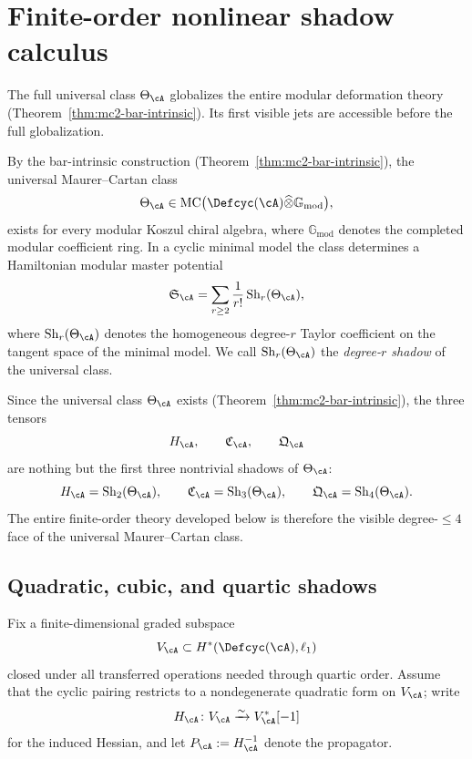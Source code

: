 \section{Finite-order nonlinear shadow calculus}
\label{sec:nms-shadow-calculus}

The full universal class $\Theta_{\cA}$ globalizes the entire modular deformation theory (Theorem~\ref{thm:mc2-bar-intrinsic}). Its first visible jets are accessible before the full globalization.

\begin{definition}
\label{def:nms-degree-shadows}
By the bar-intrinsic construction (Theorem~\ref{thm:mc2-bar-intrinsic}), the universal Maurer--Cartan class
\[
\Theta_{\cA}\in \mathrm{MC}\bigl(\Defcyc(\cA)\widehat\otimes \mathbb G_{\mathrm{mod}}\bigr),
\]
exists for every modular Koszul chiral algebra, where $\mathbb G_{\mathrm{mod}}$ denotes the completed modular coefficient ring. In a cyclic minimal model the class determines a Hamiltonian modular master potential
\[
\mathfrak S_{\cA}=\sum_{r\ge 2}\frac{1}{r!}\,\mathrm{Sh}_r(\Theta_{\cA}),
\]
where $\mathrm{Sh}_r(\Theta_{\cA})$ denotes the homogeneous degree-$r$ Taylor coefficient on the tangent space of the minimal model. We call $\mathrm{Sh}_r(\Theta_{\cA})$ the \emph{degree-$r$ shadow} of the universal class.
\end{definition}

\begin{remark}
\label{rem:nms-hcq-as-degree-shadows}
Since the universal class $\Theta_\cA$ exists (Theorem~\ref{thm:mc2-bar-intrinsic}), the three tensors
\[
H_{\cA},\qquad \mathfrak C_{\cA},\qquad \mathfrak Q_{\cA}
\]
are nothing but the first three nontrivial shadows of $\Theta_{\cA}$:
\[
H_{\cA}=\mathrm{Sh}_2(\Theta_{\cA}),
\qquad
\mathfrak C_{\cA}=\mathrm{Sh}_3(\Theta_{\cA}),
\qquad
\mathfrak Q_{\cA}=\mathrm{Sh}_4(\Theta_{\cA}).
\]
The entire finite-order theory developed below is therefore the visible degree-$\le 4$ face of the universal Maurer--Cartan class.
\end{remark}

\subsection{Quadratic, cubic, and quartic shadows}
\label{subsec:nms-shadow-jets}

\begin{setup}
\label{setup:nms-cyclic-slice}
Fix a finite-dimensional graded subspace
\[
V_{\cA}\subset H^*(\Defcyc(\cA),\ell_1)
\]
closed under all transferred operations needed through quartic order. Assume that the cyclic pairing restricts to a nondegenerate quadratic form on $V_{\cA}$; write
\[
H_{\cA}\colon V_{\cA}\xrightarrow{\sim}V_{\cA}^*[-1]
\]
for the induced Hessian, and let $P_{\cA}:=H_{\cA}^{-1}$ denote the propagator.
\end{setup}

